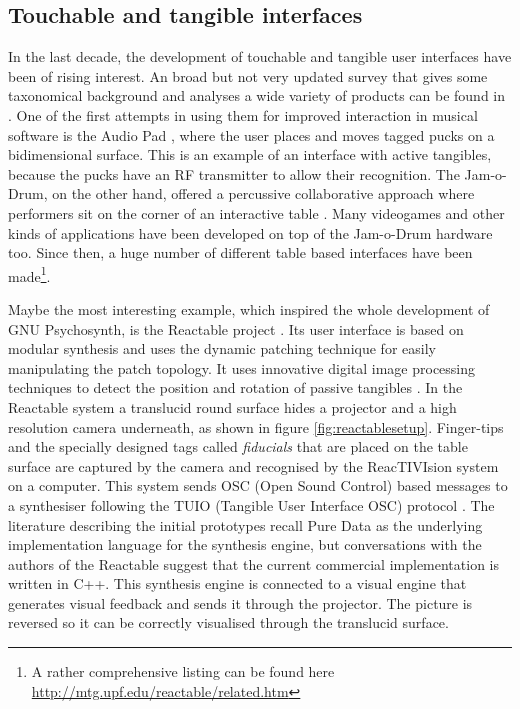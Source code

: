 \subsection{Touchable and tangible interfaces}

In the last decade, the development of touchable and
tangible user interfaces have been of rising interest. An broad but
not very updated survey that gives some taxonomical background and
analyses a wide variety of products can be found in
\cite{blaine2003contexts}. One of the first attempts in using them for
improved interaction in musical software is the Audio Pad \cite{patten2002audiopad}, where the user places and moves
tagged pucks on a bidimensional surface. This is an example of an
interface with active tangibles, because the
pucks have an RF transmitter to allow their recognition. The
Jam-o-Drum, on the other hand, offered a percussive collaborative
approach where performers sit on the corner of an interactive table
\cite{blaine00jam}. Many videogames and other kinds of applications
have been developed on top of the Jam-o-Drum hardware too. Since then,
a huge number of different table based interfaces have been
made\footnote{A rather comprehensive listing can be found here
  \url{http://mtg.upf.edu/reactable/related.htm}}.

Maybe the most interesting example, which inspired the whole
development of GNU Psychosynth, is the Reactable
project \cite{jorda07thereactable}. Its user
interface is based on modular synthesis and uses the dynamic patching
technique for easily manipulating the patch topology. It uses
innovative digital image processing techniques to detect the position
and rotation of passive tangibles
\cite{bencina06improved}. In the Reactable system a translucid round
surface hides a projector and a high resolution camera underneath, as
shown in figure \ref{fig:reactablesetup}. Finger-tips and the
specially designed tags called \emph{fiducials} that are placed on the
table surface are captured by the camera and recognised by the
ReacTIVIsion system on a computer. This system sends OSC (Open Sound Control) \cite{center03osc} based
messages to a synthesiser following the TUIO (Tangible User Interface OSC) protocol
\cite{kaltenbrunner05tuio}. The literature describing the initial
prototypes recall Pure Data as the underlying implementation
language for the synthesis engine, but conversations with the authors
of the Reactable suggest that the current commercial implementation is
written in C++. This synthesis engine is connected to a visual engine
that generates visual feedback and sends it through the projector. The
picture is reversed so it can be correctly visualised through the
translucid surface.

